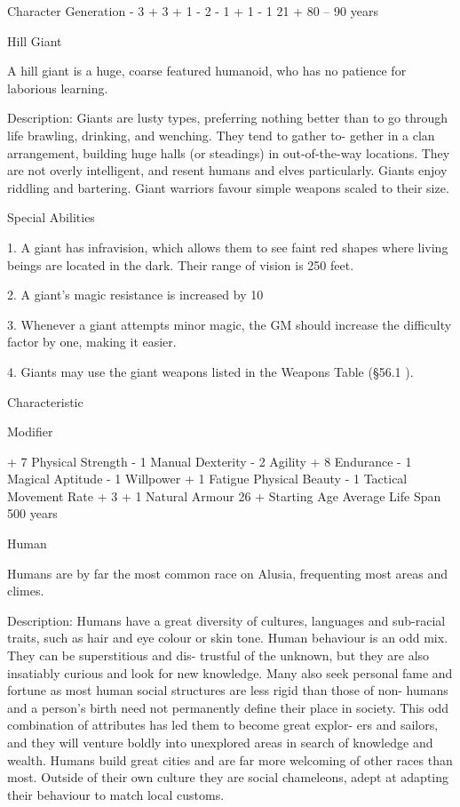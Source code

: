 \begin{Chapter}{Character Generation}
- 3 
+ 3 
+ 1 
- 2 
- 1 
+ 1 
- 1 
21 + 
80 – 90 years 

Hill Giant 

A hill giant is a huge, coarse featured humanoid, 
who has no patience for laborious learning. 

Description:  Giants  are  lusty  types,  preferring 
nothing  better  than  to  go  through  life  brawling, 
drinking,  and  wenching.  They  tend  to  gather  to-
gether  in  a  clan  arrangement,  building  huge  halls 
(or steadings) in out-of-the-way locations. They are 
not overly intelligent, and resent humans and elves 
particularly.  Giants  enjoy  riddling  and  bartering. 
Giant  warriors  favour  simple  weapons  scaled  to 
their size. 

Special Abilities 

1.  A  giant  has  infravision,  which  allows  them  to 
see faint red shapes where living beings are located 
in the dark. Their range of vision is 250 feet. 

2. A giant’s magic resistance is increased by 10%

3. Whenever a giant attempts minor magic, the GM 
should increase the difficulty factor by one, making 
it easier. 

4.  Giants  may  use  the  giant  weapons  listed  in  the 
Weapons Table (§56.1 ). 

Characteristic  

Modifier 

+ 7 
Physical Strength  
- 1 
Manual Dexterity  
- 2 
Agility  
+ 8 
Endurance  
- 1 
Magical Aptitude  
- 1 
Willpower  
+ 1 
Fatigue  
Physical Beauty  
- 1 
Tactical Movement Rate   + 3 
+ 1 
Natural Armour  
26 +  
Starting Age  
Average Life Span  
500 years 

Human 

Humans  are  by  far  the  most  common  race  on 
Alusia, frequenting most areas and climes. 

Description:  Humans  have  a  great  diversity  of 
cultures,  languages  and  sub-racial  traits,  such  as 
hair and eye colour or skin tone. Human behaviour 
is  an  odd  mix.  They  can  be  superstitious  and  dis-
trustful of the unknown, but they are also insatiably 
curious  and  look  for  new  knowledge.  Many  also 
seek  personal  fame  and  fortune  as  most  human 
social  structures  are  less  rigid  than  those  of  non-
humans and a person’s birth need not permanently 
define their place in society. This odd combination 
of  attributes  has  led  them to  become  great  explor-
ers  and  sailors,  and  they  will  venture  boldly  into 
unexplored  areas  in  search  of  knowledge  and 
wealth. Humans build great cities and are far more 
welcoming  of  other  races  than  most.  Outside  of 
their own culture they are social chameleons, adept 
at adapting their behaviour to match local customs. 


\end{Chapter}
